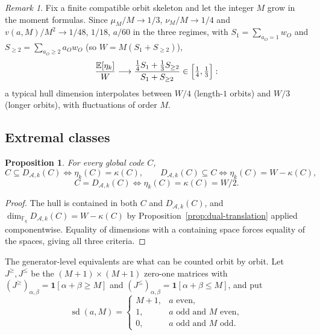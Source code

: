 \documentclass[11pt,a4paper]{article}
\newcommand{\F}{\mathbb F}
\newcommand{\A}{\mathcal A}
\numberwithin{equation}{section}
\theoremstyle{plain}
\newtheorem{proposition}[theorem]{Proposition}
\theoremstyle{definition}
\theoremstyle{remark}
\newtheorem{remark}[theorem]{Remark}
\begin{document}
\begin{remark}\label{rem:asymptotic-moments}
Fix a finite compatible orbit skeleton and let the integer $M$ grow in the
moment formulas.  Since
$\mu_M/M\to1/3$, $\nu_M/M\to1/4$ and $v(a,M)/M^2\to1/48$, $1/18$, $a/60$ in the
three regimes, with $S_1=\sum_{a_O=1}w_O$ and
$S_{\geq2}=\sum_{a_O\geq2}a_Ow_O$ (so $W=M(S_1+S_{\geq2})$),
\[
\frac{\mathbb{E}[\eta_k]}{W}\longrightarrow
 \frac{\tfrac14S_1+\tfrac13S_{\geq2}}{S_1+S_{\geq2}}\in\Bigl[\tfrac14,\tfrac13\Bigr]:
\]
a typical hull dimension interpolates between $W/4$ (length-$1$ orbits) and
$W/3$ (longer orbits), with fluctuations of order $M$.
\end{remark}

\subsection{Extremal classes}\label{sec:extremal}

\begin{proposition}\label{prop:dimension-criteria}
For every global code $C$,
\[
C\subseteq D_{\A,k}(C)\iff \eta_k(C)=\kappa(C),\qquad
D_{\A,k}(C)\subseteq C\iff \eta_k(C)=W-\kappa(C),
\]
\[
C=D_{\A,k}(C)\iff \eta_k(C)=\kappa(C)=W/2.
\]
\end{proposition}

\begin{proof}
The hull is contained in both $C$ and $D_{\A,k}(C)$, and
$\dim_{\F_q}D_{\A,k}(C)=W-\kappa(C)$ by
Proposition~\ref{prop:dual-translation} applied componentwise.  Equality of
dimensions with a containing space forces equality of the spaces, giving all
three criteria.
\end{proof}

The generator-level equivalents are what can be counted orbit by orbit.  Let
$J^{\geq},J^{\leq}$ be the $(M+1)\times(M+1)$ zero-one matrices with
$(J^{\geq})_{\alpha,\beta}=\mathbf{1}[\alpha+\beta\geq M]$ and
$(J^{\leq})_{\alpha,\beta}=\mathbf{1}[\alpha+\beta\leq M]$, and put
\[
\operatorname{sd}(a,M)=
\begin{cases}
M+1,&a\text{ even},\\
1,&a\text{ odd and }M\text{ even},\\
0,&a\text{ odd and }M\text{ odd}.
\end{cases}
\]
\end{document}
